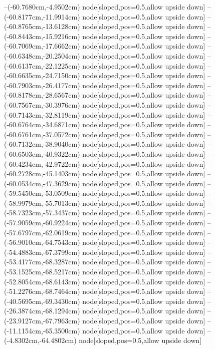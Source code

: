 --(-60.7680cm,-4.9502cm) node[sloped,pos=0.5,allow upside down]{\ArrowIn}
--(-60.8177cm,-11.9914cm) node[sloped,pos=0.5,allow upside down]{\ArrowIn}
--(-60.8765cm,-13.6128cm) node[sloped,pos=0.5,allow upside down]{\ArrowIn}
--(-60.8443cm,-15.9216cm) node[sloped,pos=0.5,allow upside down]{\ArrowIn}
--(-60.7069cm,-17.6662cm) node[sloped,pos=0.5,allow upside down]{\ArrowIn}
--(-60.6348cm,-20.2504cm) node[sloped,pos=0.5,allow upside down]{\ArrowIn}
--(-60.6137cm,-22.1225cm) node[sloped,pos=0.5,allow upside down]{\ArrowIn}
--(-60.6635cm,-24.7150cm) node[sloped,pos=0.5,allow upside down]{\ArrowIn}
--(-60.7903cm,-26.4177cm) node[sloped,pos=0.5,allow upside down]{\ArrowIn}
--(-60.8178cm,-28.6567cm) node[sloped,pos=0.5,allow upside down]{\ArrowIn}
--(-60.7567cm,-30.3976cm) node[sloped,pos=0.5,allow upside down]{\ArrowIn}
--(-60.7143cm,-32.8119cm) node[sloped,pos=0.5,allow upside down]{\ArrowIn}
--(-60.6764cm,-34.6871cm) node[sloped,pos=0.5,allow upside down]{\ArrowIn}
--(-60.6761cm,-37.0572cm) node[sloped,pos=0.5,allow upside down]{\ArrowIn}
--(-60.7132cm,-38.9040cm) node[sloped,pos=0.5,allow upside down]{\ArrowIn}
--(-60.6503cm,-40.9322cm) node[sloped,pos=0.5,allow upside down]{\ArrowIn}
--(-60.4234cm,-42.9722cm) node[sloped,pos=0.5,allow upside down]{\ArrowIn}
--(-60.2728cm,-45.1403cm) node[sloped,pos=0.5,allow upside down]{\ArrowIn}
--(-60.0534cm,-47.3629cm) node[sloped,pos=0.5,allow upside down]{\ArrowIn}
--(-59.5450cm,-53.0509cm) node[sloped,pos=0.5,allow upside down]{\ArrowIn}
--(-58.9979cm,-55.7013cm) node[sloped,pos=0.5,allow upside down]{\ArrowIn}
--(-58.7323cm,-57.3437cm) node[sloped,pos=0.5,allow upside down]{\ArrowIn}
--(-57.9059cm,-60.9224cm) node[sloped,pos=0.5,allow upside down]{\ArrowIn}
--(-57.6797cm,-62.0619cm) node[sloped,pos=0.5,allow upside down]{\ArrowIn}
--(-56.9010cm,-64.7543cm) node[sloped,pos=0.5,allow upside down]{\ArrowIn}
--(-54.4883cm,-67.3799cm) node[sloped,pos=0.5,allow upside down]{\ArrowIn}
--(-53.4177cm,-68.3287cm) node[sloped,pos=0.5,allow upside down]{\ArrowIn}
--(-53.1525cm,-68.5217cm) node[sloped,pos=0.5,allow upside down]{\arrowIn}
--(-52.8054cm,-68.6143cm) node[sloped,pos=0.5,allow upside down]{\arrowIn}
--(-51.2276cm,-68.7464cm) node[sloped,pos=0.5,allow upside down]{\ArrowIn}
--(-40.5695cm,-69.3430cm) node[sloped,pos=0.5,allow upside down]{\ArrowIn}
--(-26.3874cm,-68.1294cm) node[sloped,pos=0.5,allow upside down]{\ArrowIn}
--(-23.9127cm,-67.7963cm) node[sloped,pos=0.5,allow upside down]{\ArrowIn}
--(-11.1154cm,-65.3500cm) node[sloped,pos=0.5,allow upside down]{\ArrowIn}
--(-4.8302cm,-64.4802cm) node[sloped,pos=0.5,allow upside down]{\ArrowIn}
